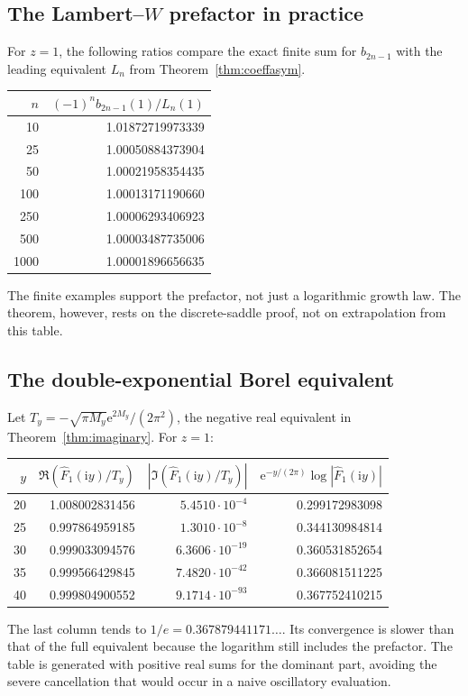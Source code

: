 \documentclass[11pt,a4paper]{article}
\numberwithin{equation}{section}
\theoremstyle{definition}
\theoremstyle{remark}
\newcommand{\ii}{\mathrm i}
\newcommand{\e}{\mathrm e}
\begin{document}
\subsection{The Lambert--\texorpdfstring{$W$}{W} prefactor in practice}
For $z=1$, the following ratios compare the exact finite sum for $b_{2n-1}$ with the leading equivalent $L_n$ from Theorem~\ref{thm:coeffasym}.
\begin{center}
\begin{tabular}{@{}rr@{}}
\toprule
$n$ & $(-1)^n b_{2n-1}(1)/L_n(1)$\\
\midrule
10 & 1.01872719973339\\
25 & 1.00050884373904\\
50 & 1.00021958354435\\
100 & 1.00013171190660\\
250 & 1.00006293406923\\
500 & 1.00003487735006\\
1000 & 1.00001896656635\\
\bottomrule
\end{tabular}
\end{center}
The finite examples support the prefactor, not just a logarithmic growth law. The theorem, however, rests on the discrete-saddle proof, not on extrapolation from this table.

\subsection{The double-exponential Borel equivalent}
Let $T_y=-\sqrt{\pi M_y}\e^{2M_y}/(2\pi^2)$, the negative real equivalent in Theorem~\ref{thm:imaginary}. For $z=1$:
\begin{center}
\begin{tabular}{@{}rrrr@{}}
\toprule
$y$ & $\Re(\widehat F_1(\ii y)/T_y)$ & $|\Im(\widehat F_1(\ii y)/T_y)|$
& $\e^{-y/(2\pi)}\log|\widehat F_1(\ii y)|$\\
\midrule
20 & 1.008002831456 & $5.4510\cdot10^{-4}$ & 0.299172983098\\
25 & 0.997864959185 & $1.3010\cdot10^{-8}$ & 0.344130984814\\
30 & 0.999033094576 & $6.3606\cdot10^{-19}$ & 0.360531852654\\
35 & 0.999566429845 & $7.4820\cdot10^{-42}$ & 0.366081511225\\
40 & 0.999804900552 & $9.1714\cdot10^{-93}$ & 0.367752410215\\
\bottomrule
\end{tabular}
\end{center}
The last column tends to $1/e=0.367879441171\ldots$. Its convergence is slower than that of the full equivalent because the logarithm still includes the prefactor. The table is generated with positive real sums for the dominant part, avoiding the severe cancellation that would occur in a naive oscillatory evaluation.
\end{document}
